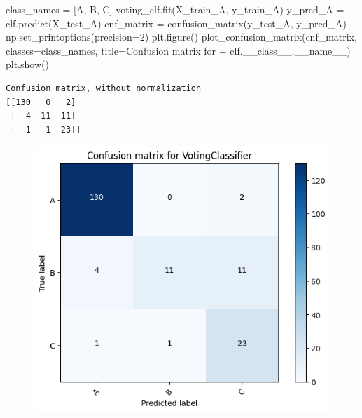 \documentclass[
  letterpaper,
  DIV=11,
  numbers=noendperiod]{scrartcl}
\newenvironment{Shaded}{\begin{snugshade}}{\end{snugshade}}
\newcommand{\DecValTok}[1]{\textcolor[rgb]{0.68,0.00,0.00}{#1}}
\newcommand{\NormalTok}[1]{\textcolor[rgb]{0.00,0.23,0.31}{#1}}
\newcommand{\OperatorTok}[1]{\textcolor[rgb]{0.37,0.37,0.37}{#1}}
\newcommand{\StringTok}[1]{\textcolor[rgb]{0.13,0.47,0.30}{#1}}
\newcommand{\VariableTok}[1]{\textcolor[rgb]{0.07,0.07,0.07}{#1}}
\begin{document}
\begin{Shaded}
\begin{Highlighting}[]
\NormalTok{class\_names }\OperatorTok{=}\NormalTok{ [}\StringTok{\textquotesingle{}A\textquotesingle{}}\NormalTok{, }\StringTok{\textquotesingle{}B\textquotesingle{}}\NormalTok{, }\StringTok{\textquotesingle{}C\textquotesingle{}}\NormalTok{]}
\NormalTok{voting\_clf.fit(X\_train\_A, y\_train\_A)}
\NormalTok{y\_pred\_A }\OperatorTok{=}\NormalTok{ clf.predict(X\_test\_A)}
\NormalTok{cnf\_matrix }\OperatorTok{=}\NormalTok{ confusion\_matrix(y\_test\_A, y\_pred\_A)}
\NormalTok{np.set\_printoptions(precision}\OperatorTok{=}\DecValTok{2}\NormalTok{)}
\NormalTok{plt.figure()}
\NormalTok{plot\_confusion\_matrix(cnf\_matrix, classes}\OperatorTok{=}\NormalTok{class\_names,}
\NormalTok{                      title}\OperatorTok{=}\StringTok{\textquotesingle{}Confusion matrix for \textquotesingle{}} \OperatorTok{+}\NormalTok{ clf.\_\_class\_\_.}\VariableTok{\_\_name\_\_}\NormalTok{)}
\NormalTok{plt.show()}
\end{Highlighting}
\end{Shaded}

\begin{verbatim}
Confusion matrix, without normalization
[[130   0   2]
 [  4  11  11]
 [  1   1  23]]
\end{verbatim}

\begin{figure}[H]

{\centering \includegraphics{transformer-paper4_files/figure-pdf/cell-9-output-2.png}

}

\end{figure}
\end{document}
